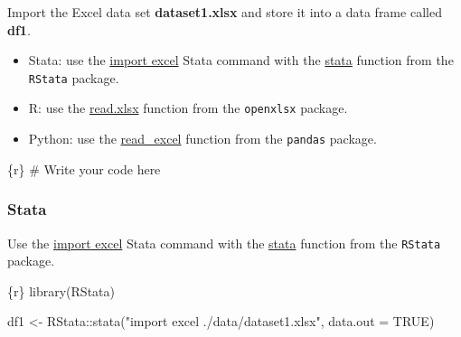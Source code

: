 \documentclass[
  letterpaper,
  DIV=11,
  numbers=noendperiod]{scrreprt}
\newenvironment{Shaded}{\begin{snugshade}}{\end{snugshade}}
\newcommand{\AttributeTok}[1]{\textcolor[rgb]{0.40,0.45,0.13}{#1}}
\newcommand{\CommentTok}[1]{\textcolor[rgb]{0.37,0.37,0.37}{#1}}
\newcommand{\ConstantTok}[1]{\textcolor[rgb]{0.56,0.35,0.01}{#1}}
\newcommand{\FunctionTok}[1]{\textcolor[rgb]{0.28,0.35,0.67}{#1}}
\newcommand{\InformationTok}[1]{\textcolor[rgb]{0.37,0.37,0.37}{#1}}
\newcommand{\NormalTok}[1]{\textcolor[rgb]{0.00,0.23,0.31}{#1}}
\newcommand{\OtherTok}[1]{\textcolor[rgb]{0.00,0.23,0.31}{#1}}
\newcommand{\SpecialCharTok}[1]{\textcolor[rgb]{0.37,0.37,0.37}{#1}}
\newcommand{\StringTok}[1]{\textcolor[rgb]{0.13,0.47,0.30}{#1}}
\providecommand{\tightlist}{%
  \setlength{\itemsep}{0pt}\setlength{\parskip}{0pt}}\usepackage{longtable,booktabs,array}
\begin{document}
Import the Excel data set \textbf{dataset1.xlsx} and store it into a
data frame called \textbf{df1}.

\begin{tcolorbox}[enhanced jigsaw, colframe=quarto-callout-tip-color-frame, colback=white, rightrule=.15mm, bottomrule=.15mm, left=2mm, arc=.35mm, coltitle=black, title=\textcolor{quarto-callout-tip-color}{\faLightbulb}\hspace{0.5em}{Tip}, opacitybacktitle=0.6, bottomtitle=1mm, opacityback=0, toptitle=1mm, toprule=.15mm, colbacktitle=quarto-callout-tip-color!10!white, titlerule=0mm, leftrule=.75mm, breakable]

\begin{itemize}
\tightlist
\item
  Stata: use the
  \href{https://www.stata.com/manuals/dimportexcel.pdf}{import excel}
  Stata command with the
  \href{https://rdrr.io/github/lbraglia/RStata/man/stata.html}{stata}
  function from the \texttt{RStata} package.
\item
  R: use the
  \href{https://www.rdocumentation.org/packages/openxlsx/versions/4.2.5/topics/read.xlsx}{read.xlsx}
  function from the \texttt{openxlsx} package.
\item
  Python: use the
  \href{https://pandas.pydata.org/docs/reference/api/pandas.read_excel.html}{read\_excel}
  function from the \texttt{pandas} package.
\end{itemize}

\end{tcolorbox}

\begin{Shaded}
\begin{Highlighting}[]
\InformationTok{\textasciigrave{}\textasciigrave{}\textasciigrave{}\{r\}}
\CommentTok{\# Write your code here}
\InformationTok{\textasciigrave{}\textasciigrave{}\textasciigrave{}}
\end{Highlighting}
\end{Shaded}

\hypertarget{stata}{%
\subsubsection{Stata}\label{stata}}

Use the \href{https://www.stata.com/manuals/dimportexcel.pdf}{import
excel} Stata command with the
\href{https://rdrr.io/github/lbraglia/RStata/man/stata.html}{stata}
function from the \texttt{RStata} package.

\begin{Shaded}
\begin{Highlighting}[]
\InformationTok{\textasciigrave{}\textasciigrave{}\textasciigrave{}\{r\}}
\FunctionTok{library}\NormalTok{(RStata)}

\NormalTok{df1 }\OtherTok{\textless{}{-}}\NormalTok{ RStata}\SpecialCharTok{::}\FunctionTok{stata}\NormalTok{(}\StringTok{"import excel ./data/dataset1.xlsx"}\NormalTok{,}
                     \AttributeTok{data.out =} \ConstantTok{TRUE}\NormalTok{)}
\InformationTok{\textasciigrave{}\textasciigrave{}\textasciigrave{}}
\end{Highlighting}
\end{Shaded}
\end{document}
